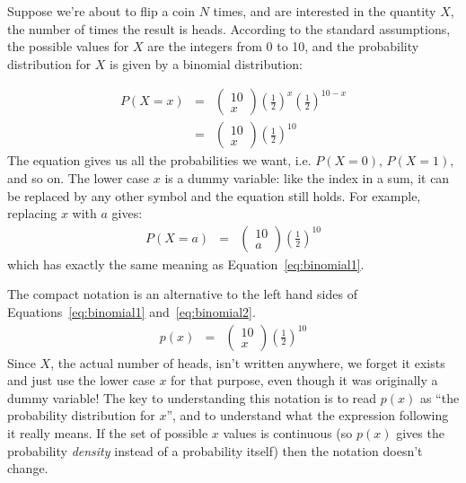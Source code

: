 Suppose we're about to flip a coin $N$ times, and are interested in the
quantity $X$, the number of times the result is heads. According
to the standard assumptions, the possible values for $X$ are the integers from 0
to 10, and the probability distribution for $X$ is given by
a binomial distribution:

\begin{eqnarray}
P(X = x) &=& \left(\begin{array}{cc}10\\ x\end{array}\right)
\left(\frac{1}{2}\right)^x\left(\frac{1}{2}\right)^{10 - x}\nonumber\\
&=& \left(\begin{array}{cc}10\\ x\end{array}\right)
\left(\frac{1}{2}\right)^{10}\label{eq:binomial1}
\end{eqnarray}
The equation gives us all the probabilities we want, i.e. $P(X=0)$, $P(X=1)$,
and so on. The lower case $x$ is a dummy variable: like the index in a sum, it
can be replaced by any other symbol and the equation still holds. For example,
replacing $x$ with $a$ gives:
\begin{eqnarray}
P(X = a) &=& \left(\begin{array}{cc}10\\ a\end{array}\right)
\left(\frac{1}{2}\right)^{10}\label{eq:binomial2}
\end{eqnarray}
which has exactly the same meaning as Equation~\ref{eq:binomial1}.

The compact notation is an alternative to the left hand sides of
Equations~\ref{eq:binomial1} and~\ref{eq:binomial2}.
\begin{eqnarray}
p(x) &=& \left(\begin{array}{cc}10\\ x\end{array}\right)
\left(\frac{1}{2}\right)^{10}
\end{eqnarray}
Since $X$, the actual number of heads, isn't written anywhere, we forget it
exists and just use the lower case $x$ for that purpose, even though it was
originally a dummy variable!
The key to understanding this notation is to read $p(x)$ as ``the probability
distribution for $x$'', and to understand what the expression following it
really means. If the set of possible $x$ values is continuous (so $p(x)$ gives
the probability {\it density} instead of a probability itself) then the
notation doesn't change.

